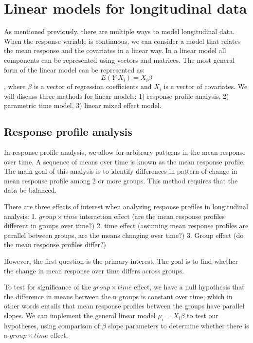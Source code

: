 \documentclass[12pt, twoside]{amherstthesis}
\begin{document}
\hypertarget{linear-models-for-longitudinal-data}{%
\section{Linear models for longitudinal data}\label{linear-models-for-longitudinal-data}}

As mentioned previously, there are multiple ways to model longitudinal data. When the response variable is continuous, we can consider a model that relates the mean response and the covariates in a linear way. In a linear model all components can be represented using vectors and matrices. The most general form of the linear model can be represented as:
\[E(Y|X_i)=X_i\beta\], where \(\beta\) is a vector of regression coefficients and \(X_i\) is a vector of covariates. We will discuss three methods for linear models: 1) response profile analysis, 2) parametric time model, 3) linear mixed effect model.

\hypertarget{response-profile-analysis}{%
\subsection{Response profile analysis}\label{response-profile-analysis}}

In response profile analysis, we allow for arbitrary patterns in the mean response over time. A sequence of means over time is known as the mean response profile. The main goal of this analysis is to identify differences in pattern of change in mean response profile among 2 or more groups. This method requires that the data be balanced.

There are three effects of interest when analyzing response profiles in longitudinal analysis:
1. \(group \times time\) interaction effect (are the mean response profiles different in groups over time?)
2. time effect (assuming mean response profiles are parallel between groups, are the means changing over time?)
3. Group effect (do the mean response profiles differ?)

However, the first question is the primary interest. The goal is to find whether the change in mean response over time differs across groups.

To test for significance of the \(group \times time\) effect, we have a null hypothesis that the difference in means between the n groups is constant over time, which in other words entails that mean response profiles between the groups have parallel slopes. We can implement the general linear model \(\mu_i = X_i\beta\) to test our hypotheses, using comparison of \(\beta\) slope parameters to determine whether there is a \(group \times time\) effect.
\end{document}

